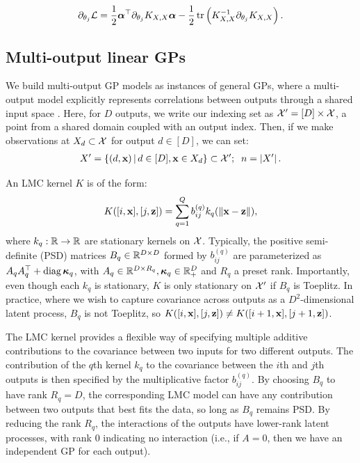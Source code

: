 \documentclass[twoside]{article}
\begin{document}
\begin{align}
\partial_{\theta_j}\mathcal{L} = \frac{1}{2}{\boldsymbol\alpha}^\top\partial_{\theta_j}K_{X,X}{\boldsymbol\alpha} -\frac{1}{2}\operatorname{tr}\left({K_{X,X}^{-1}\partial_{\theta_j}K_{X,X}}\right).\label{llgradient}
\end{align}

\subsection{Multi-output linear GPs}

We build multi-output GP models as instances of general GPs, where a multi-output model explicitly represents correlations between outputs through a shared input space \citep{alvarez2012kernels}. Here, for $D$ outputs, we write our indexing set as $\mathcal{X}'=[D]\times \mathcal{X}$, a point from a shared domain coupled with an output index. Then, if we make observations at $X_d\subset\mathcal{X}$ for output $d\in[D]$, we can set:
\begin{align*}
X'=\left\{ (d, \textbf{x}) \,\middle|\, d\in[D],\textbf{x}\in X_d \right\}\subset{\mathcal{X}'};\;\; n=\left\vert{X'}\right\vert.
\end{align*}

An LMC kernel $K$ is of the form:
\begin{align}
K([i,\textbf{x}],[j,\textbf{z}])=\sum_{q=1}^Qb_{ij}^{(q)}k_q(\left\| \textbf{x}-\textbf{z} \right\|),\label{lmcpointwise}
\end{align} 
where $k_q:\mathbb{R}\rightarrow\mathbb{R}$ are stationary kernels on $\mathcal{X}$. Typically, the positive semi-definite (PSD) matrices $B_q\in\mathbb{R}^{D\times D}$ formed by $b_{ij}^{(q)}$ are parameterized as $A_qA_q^\top+\operatorname{diag}{\boldsymbol\kappa}_q$, with $A_q\in\mathbb{R}^{D\times R_q},{\boldsymbol\kappa}_q\in\mathbb{R}_+^D$ and $R_q$ a preset rank. Importantly, even though each $k_q$ is stationary, $K$ is only stationary on $\mathcal{X}'$ if $B_q$ is Toeplitz. In practice, where we wish to capture covariance across outputs as a $D^2$-dimensional latent process, $B_q$ is not Toeplitz, so $K([i,\textbf{x}],[j,\textbf{z}])\neq K([i+1,\textbf{x}],[j+1,\textbf{z}])$.

The LMC kernel provides a flexible way of specifying multiple additive contributions to the covariance between two inputs for two different outputs. The contribution of the $q$th kernel $k_q$ to the covariance between the $i$th and $j$th outputs is then specified by the multiplicative factor $b_{ij}^{(q)}$. By choosing $B_q$ to have rank $R_q=D$, the corresponding LMC model can have any contribution between two outputs that best fits the data, so long as $B_q$ remains PSD. By reducing the rank $R_q$, the interactions of the outputs have lower-rank latent processes, with rank 0 indicating no interaction (i.e., if $A=0$, then we have an independent GP for each output).
\end{document}
